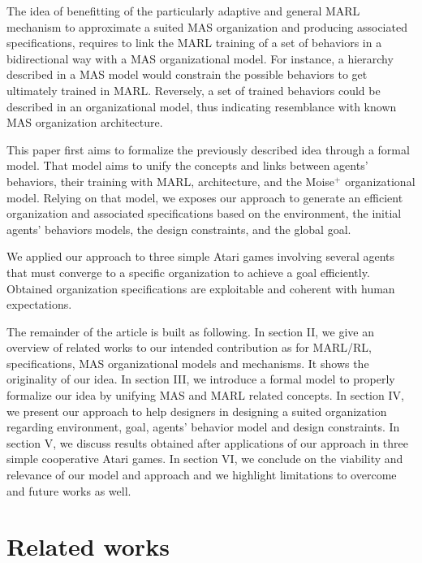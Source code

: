 \documentclass[conference]{IEEEtran}
\begin{document}
The idea of benefitting of the particularly adaptive and general MARL mechanism to approximate a suited MAS organization and producing associated specifications, requires to link the MARL training of a set of behaviors in a bidirectional way with a MAS organizational model. For instance, a hierarchy described in a MAS model would constrain the possible behaviors to get ultimately trained in MARL. Reversely, a set of trained behaviors could be described in an organizational model, thus indicating resemblance with known MAS organization architecture.

This paper first aims to formalize the previously described idea through a formal model. That model aims to unify the concepts and links between agents' behaviors, their training with MARL, architecture, and the Moise$^+$ organizational model. Relying on that model, we exposes our approach to generate an efficient organization and associated specifications based on the environment, the initial agents' behaviors models, the design constraints, and the global goal.

We applied our approach to three simple Atari games involving several agents that must converge to a specific organization to achieve a goal efficiently. Obtained organization specifications are exploitable and coherent with human expectations.

The remainder of the article is built as following.
In section II, we give an overview of related works to our intended contribution as for MARL/RL, specifications, MAS organizational models and mechanisms. It shows the originality of our idea.
In section III, we introduce a formal model to properly formalize our idea by unifying MAS and MARL related concepts.
In section IV, we present our approach to help designers in designing a suited organization regarding environment, goal, agents' behavior model and design constraints.
In section V, we discuss results obtained after applications of our approach in three simple cooperative Atari games.
In section VI, we conclude on the viability and relevance of our model and approach and we highlight limitations to overcome and future works as well.

\section{Related works}
\end{document}
